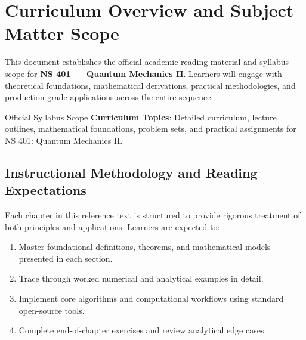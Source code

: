 \section{Curriculum Overview and Subject Matter Scope}

This document establishes the official academic reading material and syllabus scope for \textbf{NS 401 --- Quantum Mechanics II}. Learners will engage with theoretical foundations, mathematical derivations, practical methodologies, and production-grade applications across the entire sequence.

\begin{InsightBox}{Official Syllabus Scope}
  \textbf{Curriculum Topics}: Detailed curriculum, lecture outlines, mathematical foundations, problem sets, and practical assignments for NS 401: Quantum Mechanics II.
\end{InsightBox}

\subsection{Instructional Methodology and Reading Expectations}

Each chapter in this reference text is structured to provide rigorous treatment of both principles and applications. Learners are expected to:
\begin{enumerate}
  \item Master foundational definitions, theorems, and mathematical models presented in each section.
  \item Trace through worked numerical and analytical examples in detail.
  \item Implement core algorithms and computational workflows using standard open-source tools.
  \item Complete end-of-chapter exercises and review analytical edge cases.
\end{enumerate}


